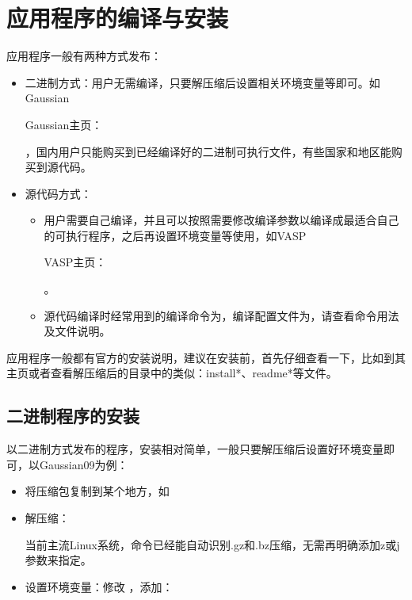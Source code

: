 \documentclass[a4paper,12pt,english]{sphinxmanual}
\begin{document}
\chapter{应用程序的编译与安装}
\label{\detokenize{compile-install/compile-install:id1}}\label{\detokenize{compile-install/compile-install::doc}}
\sphinxAtStartPar
应用程序一般有两种方式发布：
\begin{itemize}
\item {} 
\sphinxAtStartPar
二进制方式：用户无需编译，只要解压缩后设置相关环境变量等即可。如Gaussian %
\begin{footnote}[1]\sphinxAtStartFootnote
Gaussian主页：
%
\end{footnote}，国内用户只能购买到已经编译好的二进制可执行文件，有些国家和地区能购买到源代码。

\item {} 
\sphinxAtStartPar
源代码方式：
\begin{itemize}
\item {} 
\sphinxAtStartPar
用户需要自己编译，并且可以按照需要修改编译参数以编译成最适合自己的可执行程序，之后再设置环境变量等使用，如VASP %
\begin{footnote}[2]\sphinxAtStartFootnote
VASP主页：
%
\end{footnote}。

\item {} 
\sphinxAtStartPar
源代码编译时经常用到的编译命令为，编译配置文件为，请查看命令用法及文件说明。

\end{itemize}

\end{itemize}

\sphinxAtStartPar
应用程序一般都有官方的安装说明，建议在安装前，首先仔细查看一下，比如到其主页或者查看解压缩后的目录中的类似：install*、readme*等文件。


\section{二进制程序的安装}
\label{\detokenize{compile-install/compile-install:id4}}
\sphinxAtStartPar
以二进制方式发布的程序，安装相对简单，一般只要解压缩后设置好环境变量即可，以Gaussian09为例：
\begin{itemize}
\item {} 
\sphinxAtStartPar
将压缩包复制到某个地方，如

\item {} 
\sphinxAtStartPar
解压缩： %
\begin{footnote}[3]\sphinxAtStartFootnote
当前主流Linux系统，命令已经能自动识别.gz和.bz压缩，无需再明确添加z或j参数来指定。
%
\end{footnote}

\item {} 
\sphinxAtStartPar
设置环境变量：修改  ，添加：

\end{itemize}
\end{document}
